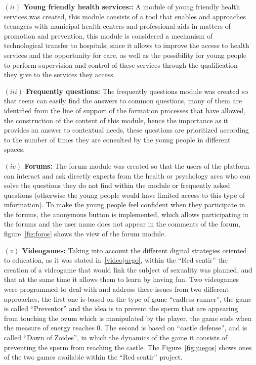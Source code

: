\documentclass[journal,transmag]{IEEEtran}
\begin{document}
\textbf{$(ii)$ Young friendly health services::} A module of young friendly health services was created, this module consists of a tool that enables and approaches teenagers with municipal health centers and professional aids in matters of promotion and prevention, this module is considered a mechanism of technological transfer to hospitals, since it allows to improve the access to health services and the opportunity for care, as well as the possibility for young people to perform supervision and control of these services through the qualification they give to the services they access. 

\textbf{$(iii)$ Frequently questions:} The frequently questions module was created so that teens can easily find the answers to common questions, many of them are identified from the line of support of the formation processes that have allowed, the construction of the content of this module, hence the importance as it provides an answer to contextual needs, these questions are prioritized according to the number of times they are consulted by the young people in different spaces. 

\textbf{$(iv)$ Forums:} The forum module was created so that the users of the platform can interact and ask directly experts from the health or psychology area who can solve the questions they do not find within the module or frequently asked questions (otherwise the young people would have limited access to this type of information). To make the young people feel confident when they participate in the forums, the anonymous button is implemented, which allows participating in the forums and the user name does not appear in the comments of the forum, figure~\ref{fig:foros} shows the view of the forum module.

\textbf{$(v)$ Videogames:} Taking into account the different digital strategies oriented to education, as it was stated in~\ref{videojuego}, within the ``Red sentir'' the creation of a videogame that would link the subject of sexuality was planned, and that at the same time it allows them to learn by having fun. Two videogames were programmed to deal with and address these issues from two different approaches, the first one is based on the type of game ``endless runner'', the game is called ``Preventor'' and the idea is to prevent the sperm that are appearing from touching the ovum which is manipulated by the player, the game ends when the measure of energy reaches $0$. The second is based on ``castle defense'', and is called ``Dawn of Zoides'', in which the dynamics of the game it consists of preventing the sperm from reaching the castle. The Figure~\ref{fig:juegos} shows ones of the two games available within the ``Red sentir'' project.
\end{document}
